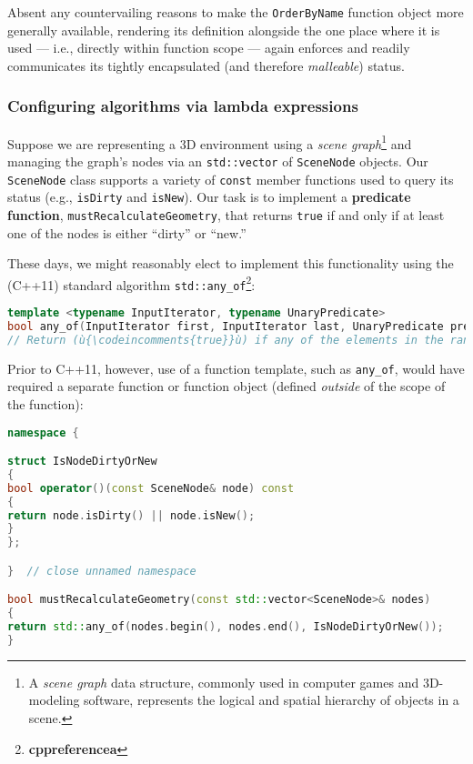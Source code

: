 \noindent Absent any countervailing reasons to make the \texttt{OrderByName}
function object more generally available, rendering its definition
alongside the one place where it is used --- i.e., directly within
function scope --- again enforces and readily communicates its tightly
encapsulated (and therefore \emph{malleable}) status.

\subsubsection[Configuring algorithms via lambda expressions]{Configuring algorithms via lambda expressions}\label{configuring-algorithms-via-lambda-expressions}

Suppose we are representing a 3D environment using a \emph{scene
graph}{\cprotect\footnote{A \emph{scene graph} data structure, commonly
used in computer games and 3D-modeling software, represents the
logical and spatial hierarchy of objects in a scene.}} and managing
the graph's nodes via an \texttt{std::vector} of \texttt{SceneNode}
objects. Our \texttt{SceneNode} class supports a variety of
\texttt{const} member functions used to query its status (e.g.,
\texttt{isDirty} and \texttt{isNew}). Our task is to implement a
\textbf{predicate function}, \texttt{mustRecalculateGeometry}, that
returns \texttt{true} if and only if at least one of the nodes is either
``dirty'' or ``new.''

These days, we might reasonably elect to implement this functionality
using the (C++11) standard algorithm
\texttt{std::any\_of}{\cprotect\footnote{\textbf{cppreferencea}}}:

\begin{lstlisting}[language=C++]
template <typename InputIterator, typename UnaryPredicate>
bool any_of(InputIterator first, InputIterator last, UnaryPredicate pred);
// Return (ù{\codeincomments{true}}ù) if any of the elements in the range satisfies (ù{\codeincomments{pred}}ù).
\end{lstlisting}

\noindent Prior to C++11, however, use of a function template, such as
\texttt{any\_of}, would have required a separate function or
function object (defined \emph{outside} of the scope of the function):

\begin{lstlisting}[language=C++]
namespace {

struct IsNodeDirtyOrNew
{
bool operator()(const SceneNode& node) const
{
return node.isDirty() || node.isNew();
}
};

}  // close unnamed namespace

bool mustRecalculateGeometry(const std::vector<SceneNode>& nodes)
{
return std::any_of(nodes.begin(), nodes.end(), IsNodeDirtyOrNew());
}
\end{lstlisting}

